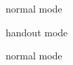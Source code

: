 \documentclass{beamer}
\makeatletter
\newcommand{\switchhandout}{\gdef\beamer@currentmode{handout}}
\newcommand{\switchbeamer}{\gdef\beamer@currentmode{beamer}}
\makeatother
\begin{document}
\begin{frame}
normal 
\pause
mode
\end{frame}

\switchhandout
\begin{frame}
handout
\pause
mode
\end{frame}
\switchbeamer

\begin{frame}
normal
\pause
mode
\end{frame}
\end{document}

